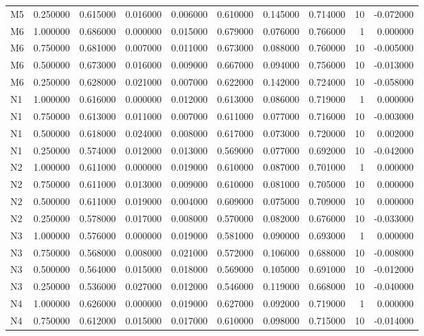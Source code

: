 \begin{table}
\begin{tabular}{lrrrrrrrrr}
M5 & 0.250000 & 0.615000 & 0.016000 & 0.006000 & 0.610000 & 0.145000 & 0.714000 & 10 & -0.072000 \\
M6 & 1.000000 & 0.686000 & 0.000000 & 0.015000 & 0.679000 & 0.076000 & 0.766000 & 1 & 0.000000 \\
M6 & 0.750000 & 0.681000 & 0.007000 & 0.011000 & 0.673000 & 0.088000 & 0.760000 & 10 & -0.005000 \\
M6 & 0.500000 & 0.673000 & 0.016000 & 0.009000 & 0.667000 & 0.094000 & 0.756000 & 10 & -0.013000 \\
M6 & 0.250000 & 0.628000 & 0.021000 & 0.007000 & 0.622000 & 0.142000 & 0.724000 & 10 & -0.058000 \\
N1 & 1.000000 & 0.616000 & 0.000000 & 0.012000 & 0.613000 & 0.086000 & 0.719000 & 1 & 0.000000 \\
N1 & 0.750000 & 0.613000 & 0.011000 & 0.007000 & 0.611000 & 0.077000 & 0.716000 & 10 & -0.003000 \\
N1 & 0.500000 & 0.618000 & 0.024000 & 0.008000 & 0.617000 & 0.073000 & 0.720000 & 10 & 0.002000 \\
N1 & 0.250000 & 0.574000 & 0.012000 & 0.013000 & 0.569000 & 0.077000 & 0.692000 & 10 & -0.042000 \\
N2 & 1.000000 & 0.611000 & 0.000000 & 0.019000 & 0.610000 & 0.087000 & 0.701000 & 1 & 0.000000 \\
N2 & 0.750000 & 0.611000 & 0.013000 & 0.009000 & 0.610000 & 0.081000 & 0.705000 & 10 & 0.000000 \\
N2 & 0.500000 & 0.611000 & 0.019000 & 0.004000 & 0.609000 & 0.075000 & 0.709000 & 10 & 0.000000 \\
N2 & 0.250000 & 0.578000 & 0.017000 & 0.008000 & 0.570000 & 0.082000 & 0.676000 & 10 & -0.033000 \\
N3 & 1.000000 & 0.576000 & 0.000000 & 0.019000 & 0.581000 & 0.090000 & 0.693000 & 1 & 0.000000 \\
N3 & 0.750000 & 0.568000 & 0.008000 & 0.021000 & 0.572000 & 0.106000 & 0.688000 & 10 & -0.008000 \\
N3 & 0.500000 & 0.564000 & 0.015000 & 0.018000 & 0.569000 & 0.105000 & 0.691000 & 10 & -0.012000 \\
N3 & 0.250000 & 0.536000 & 0.027000 & 0.012000 & 0.546000 & 0.119000 & 0.668000 & 10 & -0.040000 \\
N4 & 1.000000 & 0.626000 & 0.000000 & 0.019000 & 0.627000 & 0.092000 & 0.719000 & 1 & 0.000000 \\
N4 & 0.750000 & 0.612000 & 0.015000 & 0.017000 & 0.610000 & 0.098000 & 0.715000 & 10 & -0.014000 \\

\end{tabular}
\end{table}
